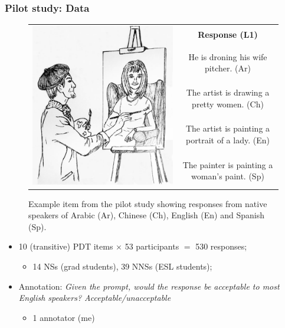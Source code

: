 \documentclass[xcolor={dvipsnames}]{beamer}
\begin{document}
\begin{frame}
\frametitle{Pilot study: Data}
\begin{small}
\begin{figure}[htb!]
\begin{center}
\bgroup
\def\arraystretch{1.45}
\begin{tabular}{|c|c|}
\hline
\multirow{5}{*}{\includegraphics[trim=0 50 0 20,clip,width=0.28\columnwidth]{figures/exampleprompt.jpg}} &
\textbf{Response (L1)} \\
\cline{2-2}
& He is droning his wife pitcher. (Ar) \\
\cline{2-2}
& The artist is drawing a pretty women. (Ch) \\
\cline{2-2}
& The artist is painting a portrait of a lady. (En) \\
\cline{2-2}
& The painter is painting a woman's paint. (Sp) \\
\hline
\end{tabular}
\egroup
\end{center}
\caption{Example item from the pilot study showing responses from native speakers of Arabic (Ar), Chinese (Ch), English (En) and Spanish (Sp).}
\label{fig:example-picture}
\end{figure}
\end{small}
\vspace{-1em}
\pause
\begin{itemize}
\item 10 (transitive) PDT items $\times$ 53 participants $=$ 530 responses;
\pause
\begin{itemize}
\item 14 NSs (grad students), 39 NNSs (ESL students);
\end{itemize}
\pause
\item Annotation: \textit{Given the prompt, would the response be acceptable to most English speakers? Acceptable/unacceptable}
\begin{itemize}
\item 1 annotator (me)
\end{itemize}
\pause
\end{itemize}
\end{frame}
\end{document}
